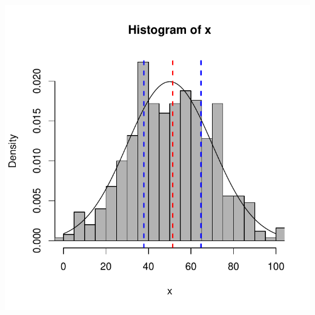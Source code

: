 \documentclass{beamer}\usepackage[]{graphicx}\usepackage[]{color}
\newenvironment{knitrout}{}{} %
\renewenvironment{knitrout}{\setlength{\topsep}{0mm}}{}
\begin{document}
\begin{frame}[fragile]
\begin{columns}[c]
\centering
\begin{knitrout}
\color{fgcolor}
\includegraphics[width=1.1\linewidth]{figure/unnamed-chunk-9-1} 

\end{knitrout}

\end{columns}

\end{frame} 
\end{document}
